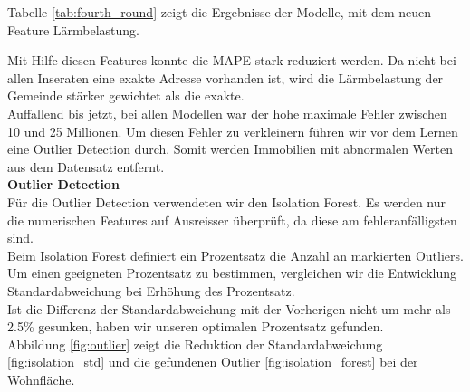Tabelle \ref{tab:fourth_round} zeigt die Ergebnisse der Modelle, mit dem neuen Feature Lärmbelastung.

\begin{table}[ht]
\centering
{}
\caption{Ergebnisse mit Einbezug der Lärmbelastung}
\label{tab:fourth_round}
\end{table}

Mit Hilfe diesen Features konnte die MAPE stark reduziert werden. Da nicht bei allen Inseraten eine exakte Adresse vorhanden ist, wird die Lärmbelastung der Gemeinde stärker gewichtet als die exakte.\\[2ex]
%
Auffallend bis jetzt, bei allen Modellen war der hohe maximale Fehler zwischen 10 und 25 Millionen. Um diesen Fehler zu verkleinern führen wir vor dem Lernen eine Outlier Detection durch. Somit werden Immobilien mit abnormalen Werten aus dem Datensatz entfernt.\\[2ex]
%
\textbf{Outlier Detection}\\
Für die Outlier Detection verwendeten wir den Isolation Forest. Es werden nur die numerischen Features auf Ausreisser überprüft, da diese am fehleranfälligsten sind.\\[2ex]
%
Beim Isolation Forest definiert ein Prozentsatz die Anzahl an markierten Outliers.
Um einen geeigneten Prozentsatz zu bestimmen, vergleichen wir die Entwicklung Standardabweichung bei Erhöhung des Prozentsatz.\\
Ist die Differenz der Standardabweichung mit der Vorherigen nicht um mehr als 2.5\% gesunken, haben wir unseren optimalen Prozentsatz gefunden.\\
Abbildung \ref{fig:outlier} zeigt die Reduktion der Standardabweichung \ref{fig:isolation_std} und die gefundenen Outlier \ref{fig:isolation_forest} bei der Wohnfläche.

